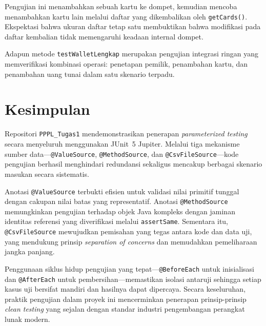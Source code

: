 \documentclass[12pt,a4paper]{article}
\begin{document}
Pengujian ini menambahkan sebuah kartu ke dompet, kemudian mencoba menambahkan kartu
lain melalui daftar yang dikembalikan oleh \texttt{getCards()}.  Ekspektasi bahwa ukuran
daftar tetap satu membuktikan bahwa modifikasi pada daftar kembalian tidak memengaruhi
keadaan internal dompet.

Adapun metode \texttt{testWalletLengkap} merupakan pengujian integrasi ringan yang
memverifikasi kombinasi operasi: penetapan pemilik, penambahan kartu, dan penambahan uang
tunai dalam satu skenario terpadu.

\section{Kesimpulan}

Repositori \texttt{PPPL\_Tugas1} mendemonstrasikan penerapan \textit{parameterized
testing} secara menyeluruh menggunakan JUnit~5 Jupiter.  Melalui tiga mekanisme sumber
data---\texttt{@ValueSource}, \texttt{@MethodSource}, dan \texttt{@CsvFileSource}---kode
pengujian berhasil menghindari redundansi sekaligus mencakup berbagai skenario masukan
secara sistematis.

Anotasi \texttt{@ValueSource} terbukti efisien untuk validasi nilai primitif tunggal
dengan cakupan nilai batas yang representatif.  Anotasi \texttt{@MethodSource}
memungkinkan pengujian terhadap objek Java kompleks dengan jaminan identitas referensi
yang diverifikasi melalui \texttt{assertSame}.  Sementara itu, \texttt{@CsvFileSource}
mewujudkan pemisahan yang tegas antara kode dan data uji, yang mendukung prinsip
\textit{separation of concerns} dan memudahkan pemeliharaan jangka panjang.

Penggunaan siklus hidup pengujian yang tepat---\texttt{@BeforeEach} untuk inisialisasi
dan \texttt{@AfterEach} untuk pembersihan---memastikan isolasi antaruji sehingga setiap
kasus uji bersifat mandiri dan hasilnya dapat dipercaya.  Secara keseluruhan, praktik
pengujian dalam proyek ini mencerminkan penerapan prinsip-prinsip \textit{clean testing}
yang sejalan dengan standar industri pengembangan perangkat lunak modern.
\end{document}
